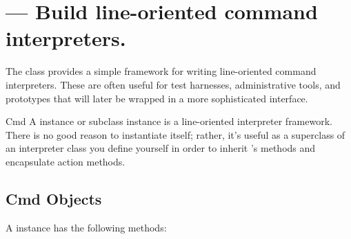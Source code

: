 \section{ ---
         Build line-oriented command interpreters.}



The  class provides a simple framework for writing
line-oriented command interpreters.  These are often useful for
test harnesses, administrative tools, and prototypes that will
later be wrapped in a more sophisticated interface.

\begin{classdesc}{Cmd}{}
A  instance or subclass instance is a line-oriented
interpreter framework.  There is no good reason to instantiate
 itself; rather, it's useful as a superclass of an
interpreter class you define yourself in order to inherit
's methods and encapsulate action methods.
\end{classdesc}

\subsection{Cmd Objects}
\label{Cmd-objects}

A  instance has the following methods:

